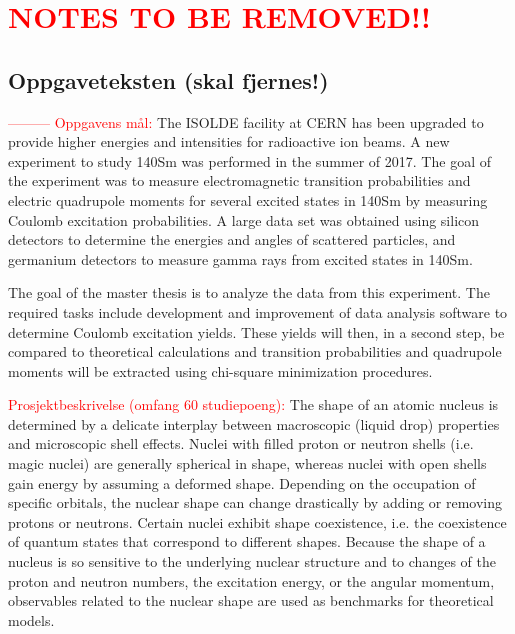 \documentclass[twoside,english]{uiofysmaster/uiofysmaster}
\begin{document}
\newpage

\chapter*{\textcolor{red}{NOTES TO BE REMOVED!!}}
\section{Oppgaveteksten (skal fjernes!)}
\textcolor{red}{---------} \newline
\textcolor{red}{Oppgavens mål:} \newline
The ISOLDE facility at CERN has been upgraded to provide higher energies and intensities for radioactive ion beams. A new experiment to study 140Sm was performed in the summer of 2017. The goal of the experiment was to measure electromagnetic transition probabilities and electric quadrupole moments for several excited states in 140Sm by measuring Coulomb excitation probabilities. A large data set was obtained using silicon detectors to determine the energies and angles of scattered particles, and germanium detectors to measure gamma rays from excited states in 140Sm. \newline

The goal of the master thesis is to analyze the data from this experiment. The required tasks include development and improvement of data analysis software to determine Coulomb excitation yields. These yields will then, in a second step, be compared to theoretical calculations and transition probabilities and quadrupole moments will be extracted using chi-square minimization procedures. \newline


\textcolor{red}{Prosjektbeskrivelse (omfang 60 studiepoeng):} \newline
The shape of an atomic nucleus is determined by a delicate interplay between macroscopic (liquid drop) properties and microscopic shell effects. Nuclei with filled proton or neutron shells (i.e. magic nuclei) are generally spherical in shape, whereas nuclei with open shells gain energy by assuming a deformed shape. Depending on the occupation of specific orbitals, the nuclear shape can change drastically by adding or removing protons or neutrons. Certain nuclei exhibit shape coexistence, i.e. the coexistence of quantum states that correspond to different shapes. Because the shape of a nucleus is so sensitive to the underlying nuclear structure and to changes of the proton and neutron numbers, the excitation energy, or the angular momentum, observables related to the nuclear shape are used as benchmarks for theoretical models. 
\end{document}
